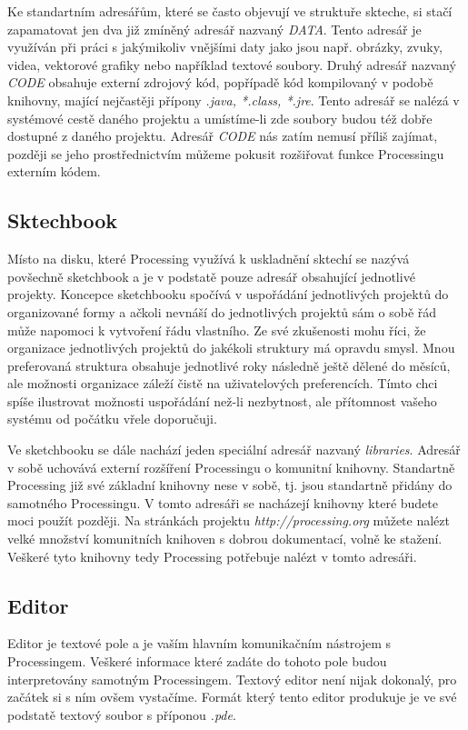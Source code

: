 \documentclass[10pt]{book}
\newcommand{\pododdil}[1]{\subsection{#1}\index{#1}\label{#1}}
\begin{document}
Ke standartním adresářům, které se často objevují ve struktuře skteche, si stačí zapamatovat jen dva již zmíněný adresář nazvaný {\em DATA}. Tento adresář je využíván při práci s jakýmikoliv vnějšími daty jako jsou např. obrázky, zvuky, videa, vektorové grafiky nebo například textové soubory. Druhý adresář nazvaný {\em CODE} obsahuje externí zdrojový kód, popřípadě kód kompilovaný v podobě knihovny, mající nejčastěji přípony {\em *.java, *.class, *.jre}. Tento adresář se nalézá v systémové cestě daného projektu a umístíme-li zde soubory budou též dobře dostupné z daného projektu. Adresář {\em CODE} nás zatím nemusí příliš zajímat, později se jeho prostřednictvím můžeme pokusit rozšiřovat funkce Processingu externím kódem.


\pododdil{Sktechbook}

Místo na disku, které Processing využívá k uskladnění sktechí se nazývá povšechně sketchbook a je v podstatě pouze adresář obsahující jednotlivé projekty. Koncepce sketchbooku spočívá v uspořádání jednotlivých projektů do organizované formy a ačkoli nevnáší do jednotlivých projektů sám o sobě řád může napomoci k vytvoření řádu vlastního. Ze své zkušenosti mohu říci, že organizace jednotlivých projektů do jakékoli struktury má opravdu smysl. Mnou preferovaná struktura obsahuje jednotlivé roky následně ještě dělené do měsíců, ale možnosti organizace záleží čistě na uživatelových preferencích. Tímto chci spíše ilustrovat možnosti uspořádání než-li nezbytnost, ale přítomnost vašeho systému od počátku vřele doporučuji.

Ve sketchbooku se dále nachází jeden speciální adresář nazvaný {\em libraries}. Adresář v sobě uchovává externí rozšíření Processingu o komunitní knihovny. Standartně Processing již své základní knihovny nese v sobě, tj. jsou standartně přidány do samotného Processingu. V tomto adresáři se nacházejí knihovny které budete moci použít později. Na stránkách projektu {\em http://processing.org} můžete nalézt velké množství komunitních knihoven s dobrou dokumentací, volně ke stažení. Veškeré tyto knihovny tedy Processing potřebuje nalézt v tomto adresáři.






\pododdil{Editor}

Editor je textové pole a je vaším hlavním komunikačním nástrojem s Processingem. Veškeré informace které zadáte do tohoto pole budou interpretovány samotným Processingem. Textový editor není nijak dokonalý, pro začátek si s ním ovšem vystačíme. Formát který tento editor produkuje je ve své podstatě textový soubor s příponou {\em *.pde}.
\end{document}
